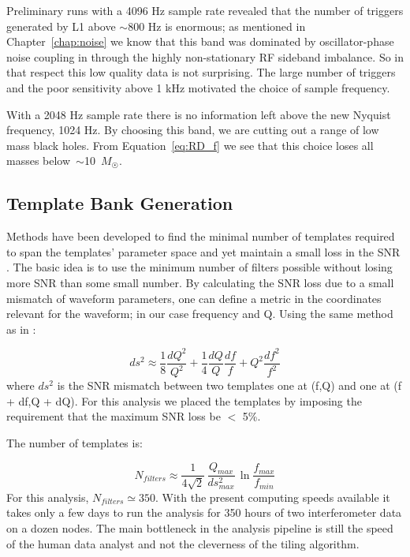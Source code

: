 Preliminary runs with a 4096 Hz sample rate revealed that the number
of triggers generated by L1 above $\sim$800 Hz is enormous; as
mentioned in Chapter~\ref{chap:noise} we know that this band was
dominated by oscillator-phase noise coupling in through the highly
non-stationary RF sideband imbalance. So in that respect this low
quality data is not surprising. The large number of triggers and the
poor sensitivity above 1 kHz motivated the choice of sample frequency.

With a 2048 Hz sample rate there is no information left above the new
Nyquist frequency, 1024 Hz. By choosing this band, we are cutting
out a range of low mass black holes. From Equation~\ref{eq:RD_f}
we see that this choice loses all masses below~$\sim$10~$M_{\astrosun}$.


\subsection{Template Bank Generation}
Methods have been developed to find the minimal number of templates required to
span the templates' parameter space and yet maintain a small loss in the SNR
\cite{Jolien:40m,Owen:templates,VIRGO:templates,TAMA:templates}. The basic
idea is to use the minimum number of filters possible without losing more
SNR than some small number. By calculating the SNR loss due to a small mismatch
of waveform parameters, one can define a metric in the coordinates
relevant for the waveform; in our case frequency and Q. Using the same method
as in \cite{Jolien:40m}:

\begin{equation}
ds^2 \approx \frac{1}{8}\frac{dQ^2}{Q^2} + \frac{1}{4}\frac{dQ}{Q}\frac{df}{f}
            + Q^2 \frac{df^2}{f^2}
\label{eq:TemplateMetric}
\end{equation}
where $ds^2$ is the SNR mismatch between two templates one at (f,Q) and one at
(f + df,Q + dQ). For this analysis we placed the templates by imposing the
requirement that the maximum SNR loss be $<$ 5\%.

The number of templates is:

\begin{equation}
N_{filters} \approx \frac{1}{4 \sqrt{2}} \, \frac{Q_{max}}{ds^{2}_{max}}
                \,    \ln{\frac{f_{max}}{f_{min}}}
\label{eq:Nfilters}
\end{equation}
For this analysis, $N_{filters} \simeq 350$. With the present computing speeds available
it takes only a few days to run the analysis for 350 hours of two interferometer
data on a dozen nodes. The main bottleneck in the analysis pipeline is still the
speed of the human data analyst and not the cleverness of the tiling algorithm.

